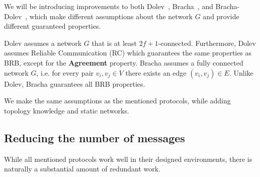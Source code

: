 
We will be introducing improvements to both Dolev~\cite{dolev}, Bracha~\cite{bracha}, and Bracha-Dolev~\cite{bracha-dolev}, which make different assumptions about the network $G$ and provide different guaranteed properties. 


Dolev assumes a network $G$ that is at least $2f+1$-connected.
Furthermore, Dolev assumes Reliable Communication (RC) which guarantees the same properties as BRB, except for the \textbf{Agreement} property. Bracha assumes a fully connected network $G$, i.e. for every pair $v_i,v_j \in V$ there exists an edge $(v_i, v_j) \in E$. Unlike Dolev, Bracha guarantees all BRB properties.

We make the same assumptions as the mentioned protocols, while adding topology knowledge and static networks.

\subsection*{Reducing the number of messages}

While all mentioned protocols work well in their designed environments, there is naturally a substantial amount of redundant work.


